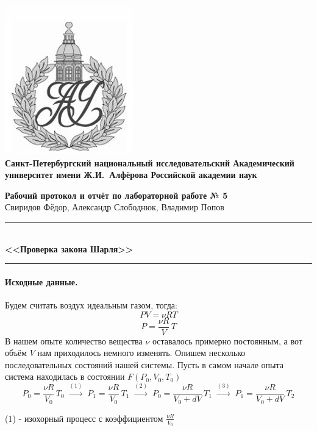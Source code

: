 \documentclass{article}
\begin{document}
\begin{center}
	\includegraphics[scale=0.25]{AU}\\
	{\Large\bfseries Санкт-Петербургский национальный исследовательский Академический университет имени Ж.И.~Алфёрова Российской академии наук}
\end{center}

\begin{center}
	{\large\textbf{Рабочий протокол и отчёт по лабораторной работе № 5}}\\
	Свиридов Фёдор, Александр Слободнюк, Владимир Попов
\end{center}

\begin{center}
	\rule{12cm}{0.4mm}\\
	\large\bfseries{<<Проверка закона Шарля>>}\\
	\rule{12cm}{0.4mm}
\end{center}

\paragraph{Исходные данные.}
Будем считать воздух идеальным газом, тогда:
$$PV=\nu RT $$
$$ P=\frac{\nu R}{V}\,T$$
В нашем опыте количество вещества $\nu$ оставалось примерно постоянным, а вот объём $V$ нам приходилось немного изменять. Опишем несколько последовательных состояний нашей системы.
Пусть в самом начале опыта система находилась в состоянии $F(P_0,V_0,T_0)$
$$ P_0=\frac{\nu R}{V_0}\,T_0\; \xrightarrow{(1)} \; P_1=\frac{\nu R}{V_0}\,T_1 \;\xrightarrow{(2)}\; P_0=\frac{\nu R}{V_0+dV}\,T_1 \;\xrightarrow{(3)} \; P_1=\frac{\nu R}{V_0+dV}\,T_2$$

(1) - изохорный процесс с коэффициентом $ \frac{\nu R}{V_0} $
\end{document}
